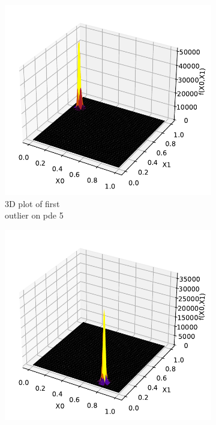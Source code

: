\documentclass[./\jobname.tex]{subfiles}
\begin{document}
\begin{figure}[H]
	\centering
	\begin{subfigure}[b]{0.3333\linewidth}
		\centering
		\includegraphics[width=1\textwidth]{../../code/experiments/experiment_2/pde5_outlier1_3D_plot.pdf}
		\caption{3D plot of first \\outlier on \gls{pde} 5}
		\label{fig:paJADE_pde5_outlier0}
	\end{subfigure}%
	\begin{subfigure}[b]{0.3333\linewidth}
		\centering
		\includegraphics[width=1\textwidth]{../../code/experiments/experiment_2/pde5_outlier2_3D_plot.pdf}

\end{subfigure}
\end{figure}
\end{document}
